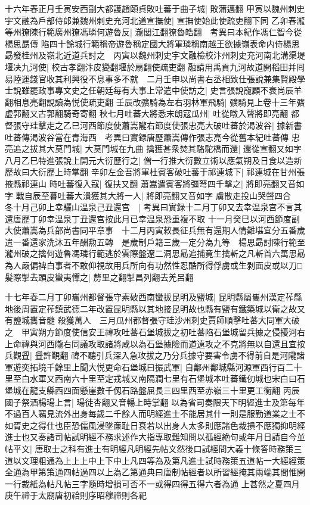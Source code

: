 十六年春正月壬寅安西副大都護趙頤貞敗吐蕃于曲子城|{
	敗蒲邁翻}
甲寅以魏州刺史宇文融為戶部侍郎兼魏州刺史充河北道宣撫使|{
	宣撫使始此使疏吏翻下同}
乙卯春瀧等州獠陳行範廣州獠馮璘何遊魯反|{
	瀧閭江翻獠魯皓翻　考異曰本紀作馮仁智今從楊思勗傳}
陷四十餘城行範稱帝遊魯稱定國大將軍璘稱南越王欲據嶺表命内侍楊思勗發桂州及嶺北近道兵討之　丙寅以魏州刺史宇文融檢校汴州刺史充河南北溝渠堤堰决九河使|{
	校古孝翻汴皮變翻堰於扇翻使疏吏翻}
融請用禹貢九河故道開稻田并囘易陸運錢官收其利興役不息事多不就　二月壬申以尚書右丞相致仕張說兼集賢殿學士說雖罷政事專文史之任朝廷每有大事上常遣中使訪之|{
	史言張說寵顧不衰尚辰羊翻相息亮翻說讀為悦使疏吏翻}
壬辰改彍騎為左右羽林軍飛騎|{
	彍騎見上卷十三年彍虚郭翻又古郭翻騎奇寄翻}
秋七月吐蕃大將悉末朗寇瓜州|{
	吐從暾入聲將即亮翻}
都督張守珪擊走之乙巳河西節度使蕭嵩隴右節度使張忠亮大破吐蕃於渇波谷|{
	據新書吐蕃傳渇波谷當在青海西　考異曰實録唐歷蕭嵩傳作張志亮今從舊本紀吐蕃傳}
忠亮追之拔其大莫門城|{
	大莫門城在九曲}
擒獲甚衆焚其駱駝橋而還|{
	還從宣翻又如字}
八月乙巳特進張說上開元大衍歷行之|{
	僧一行推大衍數立術以應氣朔及日食以造新歷故曰大衍歷上時掌翻}
辛卯左金吾將軍杜賓客破吐蕃于祁連城下|{
	祁連城在甘州張掖縣祁連山}
時吐蕃復入寇|{
	復扶又翻}
蕭嵩遣賓客將彊弩四千擊之|{
	將即亮翻又音如字}
戰自辰至暮吐蕃大潰獲其大將一人|{
	將即亮翻又音如字}
虜散走投山哭聲四合　冬十月己卯上幸驪山温泉己丑還宫　|{
	考異曰實録十二月丁卯又去幸温泉宫不言其還唐歷丁卯幸温泉丁丑還宫按此月已幸温泉恐重複不取}
十一月癸巳以河西節度副大使蕭嵩為兵部尚書同平章事　十二月丙寅敕長征兵無有還期人情難堪宜分五番歲遣一番還家洗沐五年酬勲五轉　是歲制戶籍三歲一定分為九等　楊思勗討陳行範至瀧州破之擒何遊魯馮璘行範逃於雲際盤遼二洞思勗追捕竟生擒斬之凡斬首六萬思勗為人嚴偏禆白事者不敢仰視故用兵所向有功然性忍酷所得俘虜或生剥面皮或以刀□髪際掣去頭皮蠻夷憚之|{
	剺里之翻掣昌列翻去羌呂翻}


十七年春二月丁卯巂州都督張守素破西南蠻拔昆明及鹽城|{
	昆明縣屬巂州漢定莋縣地後周置定莋鎮武德二年改置昆明縣以其地接昆明故也縣有鹽有鐵築城以衛之故又有鹽城巂音髓}
殺獲萬人　三月瓜州都督張守珪沙州刺史賈師順擊吐蕃大同軍大破之　甲寅朔方節度使信安王禕攻吐蕃石堡城拔之初吐蕃陷石堡城留兵據之侵擾河右上命禕與河西隴右同議攻取諸將咸以為石堡據險而道遠攻之不克將無以自還且宜按兵觀舋|{
	舋許覲翻}
禕不聽引兵深入急攻拔之乃分兵據守要害令虜不得前自是河隴諸軍遊奕拓境千餘里上聞大悦更命石堡城曰振武軍|{
	自鄯州鄯城縣河源軍西行百二十里至白水軍又西南六十里至定戎城又南隔澗七里有石堡城本吐蕃䥫仞城也宋白曰石堡城在龍支縣西四面懸崖數千仭石路盤屈長三四里西至赤嶺三十里更工衡翻}
丙辰國子祭酒楊瑒上言|{
	瑒徒杏翻又音暢上時掌翻}
以為省司奏限天下明經進士及第每年不過百人竊見流外出身每歲二千餘人而明經進士不能居其什一則是服勤道業之士不如胥史之得仕也臣恐儒風浸墜亷耻日衰若以出身人太多則應諸色裁損不應獨抑明經進士也又奏諸司帖試明經不務求述作大指專取難知問以孤經絶句或年月日請自今並帖平文|{
	唐取士之科有進士有明經凡明經先帖文然後口試經問大義十條答時務策三道以文理粗通為上上上中上下中上凡四等為及第凡進士試時務策五道帖一大經經策全通為甲第策通四帖過四以上為乙第通典曰唐制帖經者以所習經掩其兩端其間惟開一行裁紙為帖凡帖三字隨時增損可否不一或得四得五得六者為通}
上甚然之夏四月庚午禘于太廟唐初祫則序昭穆禘則各祀

